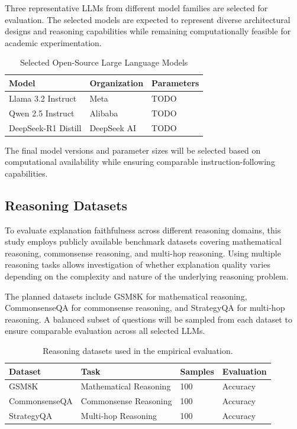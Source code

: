 \documentclass{article}
\begin{document}
Three representative LLMs from different model families are selected for evaluation. The selected models are expected to represent diverse architectural designs and reasoning capabilities while remaining computationally feasible for academic experimentation.

\begin{table}[h]
\centering
\caption{Selected Open-Source Large Language Models}
\begin{tabular}{lll}
\hline
Model & Organization & Parameters\\
\hline
Llama 3.2 Instruct & Meta & TODO\\
Qwen 2.5 Instruct & Alibaba & TODO\\
DeepSeek-R1 Distill & DeepSeek AI & TODO\\
\hline
\end{tabular}
\label{tab:models}
\end{table}

The final model versions and parameter sizes will be selected based on computational availability while ensuring comparable instruction-following capabilities.

\subsection{Reasoning Datasets}

To evaluate explanation faithfulness across different reasoning domains, this study employs publicly available benchmark datasets covering mathematical reasoning, commonsense reasoning, and multi-hop reasoning. Using multiple reasoning tasks allows investigation of whether explanation quality varies depending on the complexity and nature of the underlying reasoning problem.

The planned datasets include GSM8K for mathematical reasoning, CommonsenseQA for commonsense reasoning, and StrategyQA for multi-hop reasoning. A balanced subset of questions will be sampled from each dataset to ensure comparable evaluation across all selected LLMs.

\begin{table}[h]
\centering
\caption{Reasoning datasets used in the empirical evaluation.}
\label{tab:datasets}
\begin{tabular}{llll}
\hline
\textbf{Dataset} & \textbf{Task} & \textbf{Samples} & \textbf{Evaluation} \\
\hline
GSM8K & Mathematical Reasoning & 100 & Accuracy \\
CommonsenseQA & Commonsense Reasoning & 100 & Accuracy \\
StrategyQA & Multi-hop Reasoning & 100 & Accuracy \\
\hline
\end{tabular}
\end{table}
\end{document}
